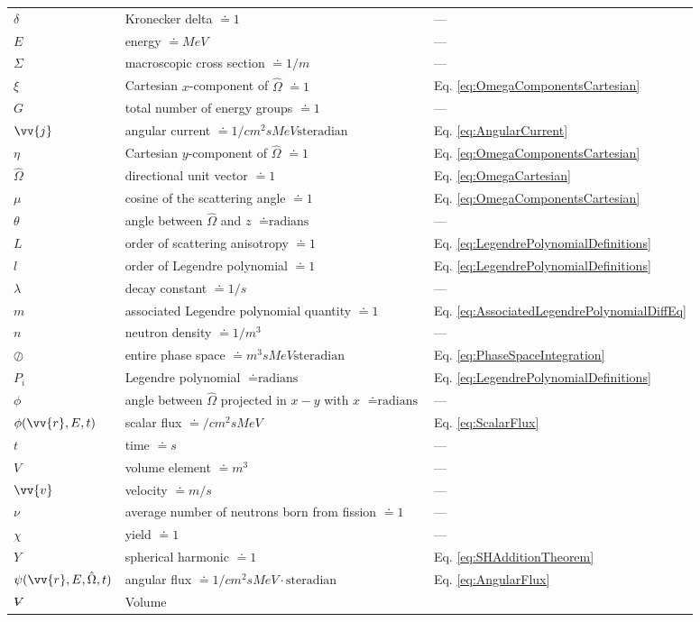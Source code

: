 \documentclass[10pt]{article}
\newcommand{\hO}{\hat{\Omega}}
\newcommand{\spa}{(\vv{r}, E, \hO, t)}
\newcommand{\volume}{\mathop{\ooalign{\hfil$V$\hfil\cr\kern0.08em--\hfil\cr}}\nolimits}
\begin{document}
\begin{flushleft}
\begin{tabular}{l l l}
\(\delta\) & Kronecker delta \(\doteq 1\) & ---\\
\(E\) & energy \(\doteq MeV\) & ---\\
\(\Sigma\) & macroscopic cross section \(\doteq 1/m\) & ---\\
\(\xi\) & Cartesian \(x\)-component of \(\hO  \) \(\doteq 1\) & Eq. \ref{eq:OmegaComponentsCartesian}\\
\(G\) & total number of energy groups \(\doteq 1\) & ---\\
\(\vv{j}\) & angular current \(\doteq 1/cm^2sMeV\textrm{steradian}\) & Eq. \ref{eq:AngularCurrent}\\
\(\eta\) & Cartesian \(y\)-component of \(\hO  \) \(\doteq 1\) & Eq. \ref{eq:OmegaComponentsCartesian}\\
\(\hO  \) & directional unit vector \(\doteq 1\) & Eq. \ref{eq:OmegaCartesian}\\
\(\mu\) & cosine of the scattering angle \(\doteq 1\) & Eq. \ref{eq:OmegaComponentsCartesian}\\
\(\theta\) & angle between \(\hO  \) and \(z\) \(\doteq \textrm{radians}\) & ---\\
\(L\) & order of scattering anisotropy \(\doteq 1\) & Eq. \ref{eq:LegendrePolynomialDefinitions}\\
\(l\) & order of Legendre polynomial \(\doteq 1\) & Eq. \ref{eq:LegendrePolynomialDefinitions}\\
\(\lambda\) & decay constant \(\doteq 1/s\) & ---\\
\(m\) & associated Legendre polynomial quantity \(\doteq 1\) & Eq. \ref{eq:AssociatedLegendrePolynomialDiffEq}\\
\(n\) & neutron density \(\doteq 1/m^3\) & ---\\
\(\oslash\) & entire phase space \(\doteq m^3sMeV\textrm{steradian}\) & Eq. \ref{eq:PhaseSpaceIntegration}\\
\(P_i\) & Legendre polynomial \(\doteq \textrm{radians}\) & Eq. \ref{eq:LegendrePolynomialDefinitions}\\
\(\phi\) & angle between \(\hO  \) projected in \(x-y\) with \(x\) \(\doteq \textrm{radians}\) & ---\\
\(\phi(\vv{r}, E, t)\) & scalar flux \(\doteq /cm^2sMeV\) & Eq. \ref{eq:ScalarFlux}\\
\(t\) & time \(\doteq s\) & ---\\
\(V\) & volume element \(\doteq m^3\) & ---\\
\(\vv{v}\) & velocity \(\doteq m/s\) & ---\\
\(\nu\) & average number of neutrons born from fission \(\doteq 1\) & ---\\
\(\chi\) & yield \(\doteq 1\) & ---\\
\(Y\) & spherical harmonic \(\doteq 1\) & Eq. \ref{eq:SHAdditionTheorem}\\
\(\psi\spa \) & angular flux \(\doteq 1/cm^2sMeV\cdot\textrm{steradian}\) & Eq. \ref{eq:AngularFlux}\\
\(\volume\) & Volume\\


\end{tabular}
\end{flushleft}
\end{document}
